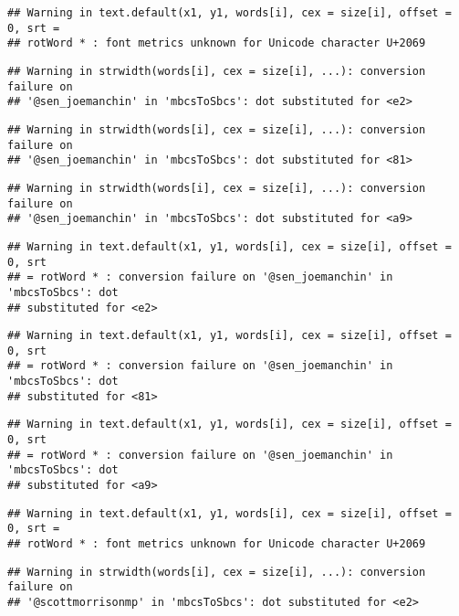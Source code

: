 \documentclass[
]{article}
\begin{document}
\begin{verbatim}
## Warning in text.default(x1, y1, words[i], cex = size[i], offset = 0, srt =
## rotWord * : font metrics unknown for Unicode character U+2069
\end{verbatim}

\begin{verbatim}
## Warning in strwidth(words[i], cex = size[i], ...): conversion failure on
## '@sen_joemanchin⁩' in 'mbcsToSbcs': dot substituted for <e2>
\end{verbatim}

\begin{verbatim}
## Warning in strwidth(words[i], cex = size[i], ...): conversion failure on
## '@sen_joemanchin⁩' in 'mbcsToSbcs': dot substituted for <81>
\end{verbatim}

\begin{verbatim}
## Warning in strwidth(words[i], cex = size[i], ...): conversion failure on
## '@sen_joemanchin⁩' in 'mbcsToSbcs': dot substituted for <a9>
\end{verbatim}

\begin{verbatim}
## Warning in text.default(x1, y1, words[i], cex = size[i], offset = 0, srt
## = rotWord * : conversion failure on '@sen_joemanchin⁩' in 'mbcsToSbcs': dot
## substituted for <e2>
\end{verbatim}

\begin{verbatim}
## Warning in text.default(x1, y1, words[i], cex = size[i], offset = 0, srt
## = rotWord * : conversion failure on '@sen_joemanchin⁩' in 'mbcsToSbcs': dot
## substituted for <81>
\end{verbatim}

\begin{verbatim}
## Warning in text.default(x1, y1, words[i], cex = size[i], offset = 0, srt
## = rotWord * : conversion failure on '@sen_joemanchin⁩' in 'mbcsToSbcs': dot
## substituted for <a9>
\end{verbatim}

\begin{verbatim}
## Warning in text.default(x1, y1, words[i], cex = size[i], offset = 0, srt =
## rotWord * : font metrics unknown for Unicode character U+2069
\end{verbatim}

\begin{verbatim}
## Warning in strwidth(words[i], cex = size[i], ...): conversion failure on
## '@scottmorrisonmp⁩' in 'mbcsToSbcs': dot substituted for <e2>
\end{verbatim}
\end{document}
